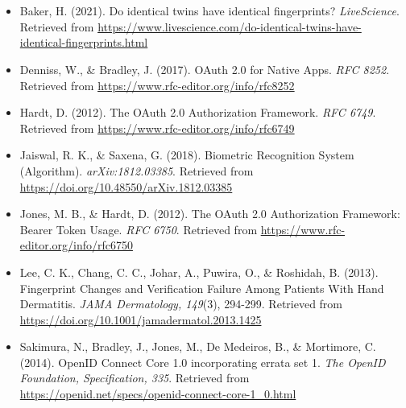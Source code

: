 
\chapter*{}%
\label{ch:bibliografie}


\begin{itemize}[label={}]
    \item Baker, H. (2021). Do identical twins have identical fingerprints? \textit{LiveScience}. Retrieved from \url{https://www.livescience.com/do-identical-twins-have-identical-fingerprints.html}
        
    \item Denniss, W., \& Bradley, J. (2017). OAuth 2.0 for Native Apps. \textit{RFC 8252}. Retrieved from \url{https://www.rfc-editor.org/info/rfc8252}
    
    \item Hardt, D. (2012). The OAuth 2.0 Authorization Framework. \textit{RFC 6749}. Retrieved from \url{https://www.rfc-editor.org/info/rfc6749}
    
    \item Jaiswal, R. K., \& Saxena, G. (2018). Biometric Recognition System (Algorithm). \textit{arXiv:1812.03385}. Retrieved from \url{https://doi.org/10.48550/arXiv.1812.03385}
    
    \item Jones, M. B., \& Hardt, D. (2012). The OAuth 2.0 Authorization Framework: Bearer Token Usage. \textit{RFC 6750}. Retrieved from \url{https://www.rfc-editor.org/info/rfc6750}
        
    \item Lee, C. K., Chang, C. C., Johar, A., Puwira, O., \& Roshidah, B. (2013). Fingerprint Changes and Verification Failure Among Patients With Hand Dermatitis. \textit{JAMA Dermatology, 149}(3), 294-299. Retrieved from \url{https://doi.org/10.1001/jamadermatol.2013.1425}
        
    \item Sakimura, N., Bradley, J., Jones, M., De Medeiros, B., \& Mortimore, C. (2014). OpenID Connect Core 1.0 incorporating errata set 1. \textit{The OpenID Foundation, Specification, 335}. Retrieved from \url{https://openid.net/specs/openid-connect-core-1_0.html}
    

\end{itemize}
